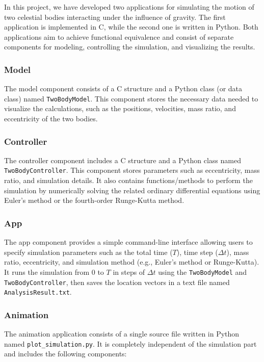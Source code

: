 \documentclass{article}
\begin{document}
In this project, we have developed two applications for simulating the motion of two celestial bodies interacting under the influence of gravity. The first application is implemented in C, while the second one is written in Python. Both applications aim to achieve functional equivalence and consist of separate components for modeling, controlling the simulation, and visualizing the results.


\subsubsection*{Model}

The model component consists of a C structure and a Python class (or data class) named \texttt{TwoBodyModel}. This component stores the necessary data needed to visualize the calculations, such as the positions, velocities, mass ratio, and eccentricity of the two bodies.

\subsubsection*{Controller}

The controller component includes a C structure and a Python class named \texttt{TwoBodyController}. This component stores parameters such as eccentricity, mass ratio, and simulation details. It also contains functions/methods to perform the simulation by numerically solving the related ordinary differential equations using Euler's method or the fourth-order Runge-Kutta method.

\subsubsection*{App}

The app component provides a simple command-line interface allowing users to specify simulation parameters such as the total time (\(T\)), time step (\(Δt\)), mass ratio, eccentricity, and simulation method (e.g., Euler's method or Runge-Kutta). It runs the simulation from \(0\) to \(T\) in steps of \(Δt\) using the \texttt{TwoBodyModel} and \texttt{TwoBodyController}, then saves the location vectors in a text file named \texttt{AnalysisResult.txt}.

\subsubsection*{Animation}

The animation application consists of a single source file written in Python named \texttt{plot\_simulation.py}. It is completely independent of the simulation part and includes the following components:
\end{document}
